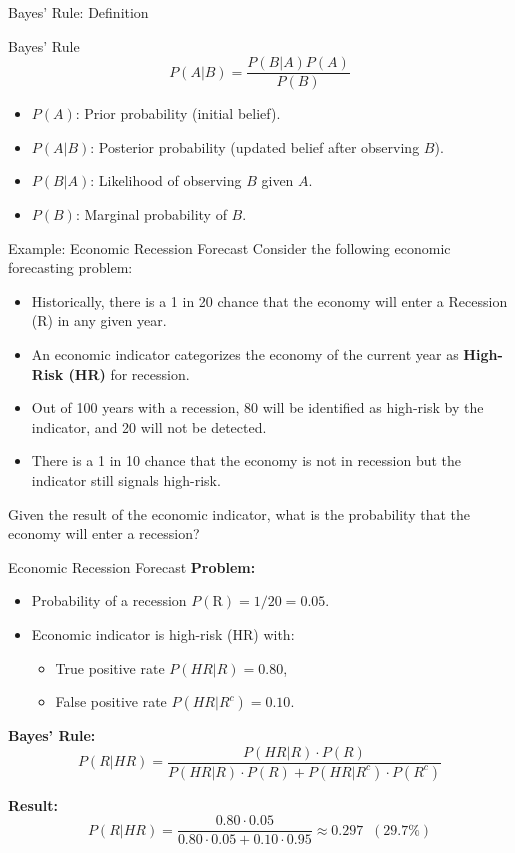 \documentclass[aspectratio=169]{beamer}
\begin{document}
\begin{frame}{Bayes' Rule: Definition}
    \begin{coolblock}{Bayes' Rule}
    \[
    P(A | B) = \frac{P(B | A)P(A)}{P(B)}
    \]
    \end{coolblock}
    \begin{itemize}
        \item \(P(A)\): Prior probability (initial belief).
        \item \(P(A | B)\): Posterior probability (updated belief after observing \(B\)).
        \item \(P(B | A)\): Likelihood of observing \(B\) given \(A\).
        \item \(P(B)\): Marginal probability of \(B\).
    \end{itemize}
\end{frame}

\begin{frame}{Example: Economic Recession Forecast}
    Consider the following economic forecasting problem:
    \begin{itemize}
        \item Historically, there is a 1 in 20 chance that the economy will enter a Recession (R) in any given year.
        \item An economic indicator categorizes the economy of the current year as \textbf{High-Risk (HR)} for recession.
        \item Out of 100 years with a recession, 80 will be identified as high-risk by the indicator, and 20 will not be detected.
        \item There is a 1 in 10 chance that the economy is not in recession but the indicator still signals high-risk.
    \end{itemize}
    Given the result of the economic indicator, what is the probability that the economy will enter a recession?
\end{frame}

\begin{frame}{Economic Recession Forecast}
    \textbf{Problem:}
    \begin{itemize}
        \item Probability of a recession \(P(\text{R}) = 1/20 = 0.05\).
        \item Economic indicator is high-risk (HR) with:
        \begin{itemize}
            \item[$\bullet$] True positive rate $P(HR | R)= 0.80$,
            \item[$\bullet$] False positive rate $P(HR | R^c) = 0.10$.
        \end{itemize}
    \end{itemize}

    \textbf{Bayes' Rule:}
    $$
    P(R | HR) = \frac{P(HR | R) \cdot P(R)}{P(HR | R) \cdot P(R) + P(HR | R^c) \cdot P(R^c)}
    $$

    \textbf{Result:}
    $$
    P(R | HR) = \frac{0.80 \cdot 0.05}{0.80 \cdot 0.05 + 0.10 \cdot 0.95} \approx 0.297 \;\; (29.7\%)
    $$
\end{frame}
\end{document}
